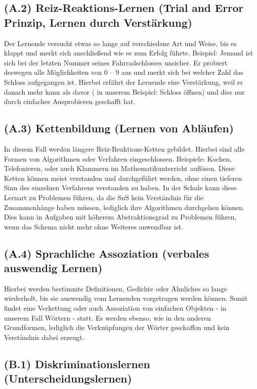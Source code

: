 \subsection[]{(A.2) Reiz-Reaktions-Lernen (Trial and Error Prinzip, Lernen durch Verstärkung)}

Der Lernende versucht etwas so lange auf verschiedene Art und Weise, bis es klappt und merkt sich anschließend wie es zum Erfolg führte. 
Beispiel: Jemand ist sich bei der letzten Nummer seines Fahrradschlosses unsicher. Er probiert deswegen  alle Möglichkeiten von 0 – 9 aus und merkt sich bei welcher Zahl das Schloss aufgegangen ist. Hierbei erfährt der Lernende eine Verstärkung, weil er danach mehr kann als davor ( in unserem Beispiel: Schloss öffnen) und dies nur durch einfaches Ausprobieren geschafft hat.

\subsection[]{(A.3) Kettenbildung (Lernen von Abläufen)}

In diesem Fall werden längere Reiz-Reaktions-Ketten gebildet. Hierbei sind alle Formen von Algorithmen oder Verfahren eingeschlossen. Beispiele: Kochen, Telefonieren, oder auch Klammern im Mathematikunterricht auflösen. Diese Ketten können meist verstanden und durchgeführt werden, ohne einen tieferen Sinn des einzelnen Verfahrens verstanden zu haben. In der Schule kann diese Lernart zu Problemen führen, da die \gls{SuS} kein Verständnis für die Zusammenhänge haben müssen, lediglich ihre Algorithmen durchgehen können. Dies kann in Aufgaben mit höherem Abstraktionsgrad zu Problemen führen, wenn das Schema nicht mehr ohne Weiteres anwendbar ist.

\subsection[]{(A.4) Sprachliche Assoziation (verbales auswendig Lernen)}

Hierbei werden bestimmte Definitionen, Gedichte oder Ähnliches so lange wiederholt, bis sie auswendig vom Lernenden vorgetragen werden können. Somit findet eine Verkettung oder auch Assoziation von einfachen Objekten - in unserem Fall Wörtern - statt. Es werden ebenso, wie in den anderen Grundformen, lediglich die Verknüpfungen der Wörter geschaffen und kein Verständnis dabei erzeugt. 

\subsection[]{(B.1) Diskriminationslernen (Unterscheidungslernen)}

